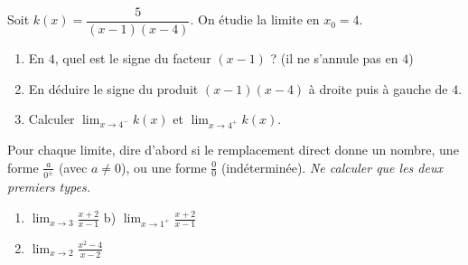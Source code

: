 \documentclass[11pt,a4paper]{article}
\begin{document}
\begin{exercice}
Soit $k(x)=\dfrac{5}{(x-1)(x-4)}$. On étudie la limite en $x_0=4$.
\begin{enumerate}[label=\alph*),leftmargin=2em,itemsep=3pt]
  \item En $4$, quel est le signe du facteur $(x-1)$ ? (il ne s'annule pas en $4$)
  \item En déduire le signe du produit $(x-1)(x-4)$ à droite puis à gauche de $4$.
  \item Calculer $\displaystyle\lim_{x\to 4^{-}} k(x)$ et $\displaystyle\lim_{x\to 4^{+}} k(x)$.
\end{enumerate}
\end{exercice}

\begin{exercice}
Pour chaque limite, dire d'abord si le remplacement direct donne un nombre, une forme
$\frac{a}{0^{\pm}}$ (avec $a\neq 0$), ou une forme $\frac{0}{0}$ (indéterminée). \emph{Ne calculer
que les deux premiers types.}
\begin{enumerate}[label=\alph*),leftmargin=2em,itemsep=3pt]
  \item $\displaystyle\lim_{x\to 3}\frac{x+2}{x-1}$ \qquad b) $\displaystyle\lim_{x\to 1^{+}}\frac{x+2}{x-1}$
  \item $\displaystyle\lim_{x\to 2}\frac{x^2-4}{x-2}$
\end{enumerate}
\end{exercice}
\end{document}
